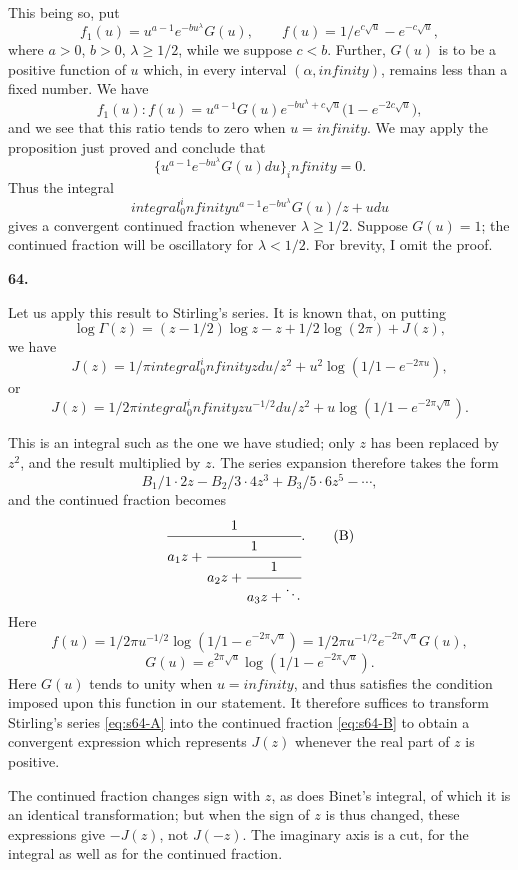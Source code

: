 \documentclass[
  paper=b5,
  fontsize=13pt,
  twoside,
  headings=normal,
  bookmarkpackage=false
]{scrartcl}
\theoremstyle{stieltjesplain}
\theoremstyle{stieltjesdefinition}
\def\int{integral}%
\def\frac#1#2{#1/#2}%
\def\infty{infinity}%
\def\,{ }%
\newcommand{\origsection}[1]{%
  \par\addvspace{0.85\baselineskip}%
  \phantomsection\label{sec:#1}%
  \addcontentsline{toc}{subsection}{\texorpdfstring{\S~#1}{Section #1}}%
  \noindent\textbf{#1.}\quad\ignorespaces
}
\begin{document}
This being so, put
\[
  f_1(u)=u^{a-1}e^{-bu^\lambda}G(u),
  \qquad
  f(u)=\frac{1}{e^{c\sqrt u}-e^{-c\sqrt u}},
\]
where $a>0$, $b>0$, $\lambda\geq\frac12$, while we suppose $c<b$.
Further, $G(u)$ is to be a positive function of $u$ which, in every
interval $(\alpha,\infty)$, remains less than a fixed number. We have
\[
  f_1(u):f(u)
  =u^{a-1}G(u)e^{-bu^\lambda+c\sqrt u}
   \bigl(1-e^{-2c\sqrt u}\bigr),
\]
and we see that this ratio tends to zero when $u=\infty$. We may apply
the proposition just proved and conclude that
\[
  \{u^{a-1}e^{-bu^\lambda}G(u)\,du\}_\infty=0.
\]
Thus the integral
\[
  \int_0^\infty
  \frac{u^{a-1}e^{-bu^\lambda}G(u)}{z+u}\,du
\]
gives a convergent continued fraction whenever $\lambda\geq\frac12$.
Suppose $G(u)=1$; the continued fraction will be oscillatory for
$\lambda<\frac12$. For brevity, I omit the proof.

\origsection{64}
Let us apply this result to Stirling's series. It is known that, on
putting
\[
  \log\Gamma(z)
  =\left(z-\frac12\right)\log z-z+\frac12\log(2\pi)+J(z),
\]
we have
\[
  J(z)=\frac1\pi\int_0^\infty
  \frac{z\,du}{z^2+u^2}
  \log\left(\frac1{1-e^{-2\pi u}}\right),
\]
or
\[
  J(z)=\frac1{2\pi}\int_0^\infty
  \frac{zu^{-1/2}\,du}{z^2+u}
  \log\left(\frac1{1-e^{-2\pi\sqrt u}}\right).
\]

This is an integral such as the one we have studied; only $z$ has been
replaced by $z^2$, and the result multiplied by $z$. The series
expansion therefore takes the form
\begin{equation}
  \frac{B_1}{1\cdot2\,z}
  -\frac{B_2}{3\cdot4\,z^3}
  +\frac{B_3}{5\cdot6\,z^5}-\cdots ,
  \tag{A}\label{eq:s64-A}
\end{equation}
and the continued fraction becomes
\begin{equation}
  \cfrac{1}{a_1z+\cfrac{1}{a_2z+\cfrac{1}{a_3z+\ddots}}}.
  \tag{B}\label{eq:s64-B}
\end{equation}
Here
\[
  f(u)=\frac1{2\pi}u^{-1/2}
  \log\left(\frac1{1-e^{-2\pi\sqrt u}}\right)
  =\frac1{2\pi}u^{-1/2}e^{-2\pi\sqrt u}G(u),
\]
\[
  G(u)=e^{2\pi\sqrt u}
  \log\left(\frac1{1-e^{-2\pi\sqrt u}}\right).
\]
Here $G(u)$ tends to unity when $u=\infty$, and thus satisfies the
condition imposed upon this function in our statement. It therefore
suffices to transform Stirling's series \eqref{eq:s64-A} into the
continued fraction \eqref{eq:s64-B} to obtain a convergent expression
which represents $J(z)$ whenever the real part of $z$ is positive.

The continued fraction changes sign with $z$, as does Binet's integral,
of which it is an identical transformation; but when the sign of $z$ is
thus changed, these expressions give $-J(z)$, not $J(-z)$. The imaginary
axis is a cut, for the integral as well as for the continued fraction.
\end{document}
